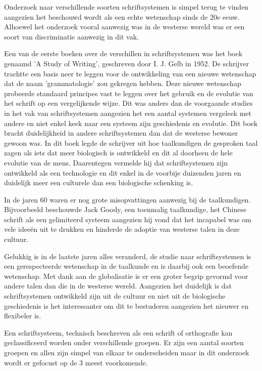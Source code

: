 Onderzoek naar verschillende soorten schriftsystemen is simpel terug te vinden aangezien het beschouwd wordt als een echte wetenschap sinds de 20e eeuw.
Alhoewel het onderzoek vooral aanwezig was in de westerse wereld was er een soort van discriminatie aanwezig in dit vak.

Een van de eerste boeken over de verschillen in schriftsystemen was het boek genaamd 'A Study of Writing', geschreven door I. J. Gelb in 1952. \autocite{Gelb1952}
De schrijver trachtte een basis neer te leggen voor de ontwikkeling van een nieuwe wetenschap dat de naam 'grammatologie' zou gekregen hebben.
Deze nieuwe wetenschap probeerde standaard principes vast te leggen over het gebruik en de evolutie van het schrift op een vergelijkende wijze.
Dit was anders dan de voorgaande studies in het vak van schriftsystemen aangezien het een aantal systemen vergeleek met andere en niet enkel keek naar een systeem zijn geschiedenis en evolutie.
Dit boek bracht duidelijkheid in andere schriftsystemen dan dat de westerse bewoner gewoon was. 
In dit boek legde de schrijver uit hoe taalkundigen de gesproken taal zagen als iets dat meer biologisch is ontwikkeld en dit al doorheen de hele evolutie van de mens.
Daarentegen vermelde hij dat schriftsystemen zijn ontwikkeld als een technologie en dit enkel in de voorbije duizenden jaren en duidelijk meer een culturele dan een biologische schenking is.

In de jaren 60 waren er nog grote misopvattingen aanwezig bij de taalkundigen.
Bijvoorbeeld beschouwde Jack Goody, een toenmalig taalkundige,  het Chinese schrift als een gelimiteerd systeem aangezien hij vond dat het incapabel was om vele ideeën uit te drukken en hinderde de adoptie van westerse talen in deze cultuur.

Gelukkig is in de laatste jaren alles veranderd, de studie naar schriftsystemen is een gerespecteerde wetenschap in de taalkunde en is daarbij ook een beoefende wetenschap. 
Met dank aan de globalisatie is er een groter begrip gevormd voor andere talen dan die in de westerse wereld.
Aangezien het duidelijk is dat schriftsystemen ontwikkeld zijn uit de cultuur en niet uit de biologische geschiedenis is het interessanter om dit te bestuderen aangezien het nieuwer en flexibeler is.

Een schriftsysteem, technisch beschreven als een schrift of orthografie kan geclassificeerd worden onder verschillende groepen.  \autocite{David} \autocite{Allan2015}
Er zijn een aantal soorten groepen en allen zijn simpel van elkaar te onderscheiden maar in dit onderzoek wordt er gefocust op de 3 meest voorkomende.

